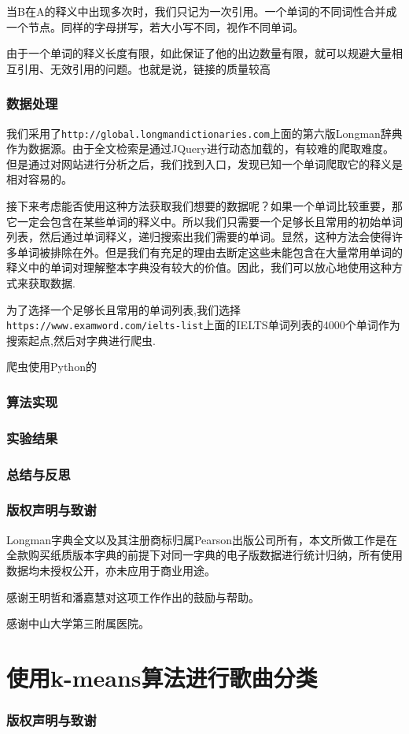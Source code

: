 \documentclass[11pt, a4paper]{article}
\begin{document}
当B在A的释义中出现多次时，我们只记为一次引用。一个单词的不同词性合并成一个节点。同样的字母拼写，若大小写不同，视作不同单词。

由于一个单词的释义长度有限，如此保证了他的出边数量有限，就可以规避大量相互引用、无效引用的问题。也就是说，链接的质量较高

\section{数据处理}
我们采用了\texttt{http://global.longmandictionaries.com}上面的第六版Longman辞典作为数据源。由于全文检索是通过JQuery进行动态加载的，有较难的爬取难度。但是通过对网站进行分析之后，我们找到入口，发现已知一个单词爬取它的释义是相对容易的。

接下来考虑能否使用这种方法获取我们想要的数据呢？如果一个单词比较重要，那它一定会包含在某些单词的释义中。所以我们只需要一个足够长且常用的初始单词列表，然后通过单词释义，递归搜索出我们需要的单词。显然，这种方法会使得许多单词被排除在外。但是我们有充足的理由去断定这些未能包含在大量常用单词的释义中的单词对理解整本字典没有较大的价值。因此，我们可以放心地使用这种方式来获取数据.

为了选择一个足够长且常用的单词列表,我们选择\texttt{https://www.examword.com/ielts-list}上面的IELTS单词列表的4000个单词作为搜索起点,然后对字典进行爬虫.

爬虫使用Python的

\section{算法实现}

\section{实验结果}

\section{总结与反思}

\section{版权声明与致谢}

Longman字典全文以及其注册商标归属Pearson出版公司所有，本文所做工作是在全款购买纸质版本字典的前提下对同一字典的电子版数据进行统计归纳，所有使用数据均未授权公开，亦未应用于商业用途。

感谢王明哲和潘嘉慧对这项工作作出的鼓励与帮助。

感谢中山大学第三附属医院。

\newpage

\part{使用k-means算法进行歌曲分类}
\setcounter{section}{0}

\section{版权声明与致谢}
\end{document}
